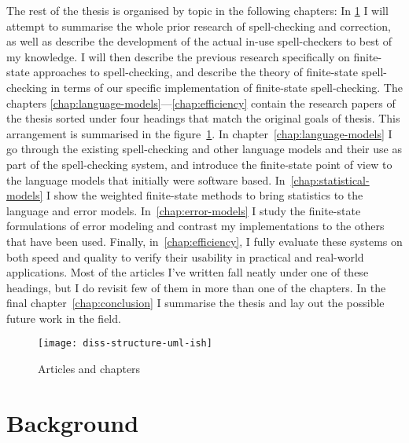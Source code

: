 \documentclass[officiallayout]{unihelcompling}
\begin{document}
The rest of the thesis is organised by topic in the following chapters: In
\ref{chap:background} I will attempt to summarise the whole prior research of
spell-checking and correction, as well as describe the development of the
actual in-use spell-checkers to best of my knowledge. I will then describe the
previous research specifically on finite-state approaches to spell-checking,
and describe the theory of finite-state spell-checking in terms of our specific
implementation of finite-state spell-checking. The chapters
\ref{chap:language-models}---\ref{chap:efficiency} contain the research papers
of the thesis sorted under four headings that match the original goals of
thesis. This arrangement is summarised in the
figure~\ref{fig:articles-chapters}. In chapter~\ref{chap:language-models} I go
through the existing spell-checking and other language models and their use as
part of the spell-checking system, and introduce the finite-state point of view
to the language models that initially were software based.
In~\ref{chap:statistical-models} I show the weighted finite-state methods to
bring statistics to the language and error models. In~\ref{chap:error-models}
I study the finite-state formulations of error modeling and contrast my
implementations to the others that have been used. Finally, 
in~\ref{chap:efficiency}, I fully evaluate these systems on both speed and
quality to verify their usability in practical and real-world applications.
Most of the articles I've written fall neatly under one of these headings, but I do revisit few of them in more than one of the chapters. In the final 
chapter~\ref{chap:conclusion} I summarise the thesis and lay out the possible
future work in the field.

\begin{figure}
    \texttt{[image: diss-structure-uml-ish]}
    \caption{Articles and chapters
    \label{fig:articles-chapters}}
\end{figure}

\chapter{Background}
\label{chap:background}
\end{document}
